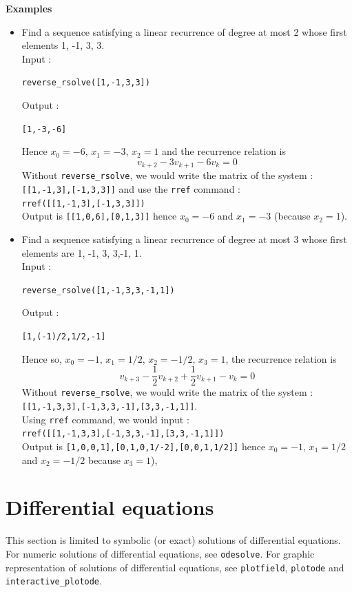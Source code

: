 \documentclass[a4paper,11pt]{book}
\begin{document}
{\bf Examples}
\begin{itemize}
\item Find a sequence satisfying a linear recurrence of degree at 
most 2 whose first elements 1, -1, 3, 3.\\
Input :
\begin{center}{\tt reverse\_rsolve([1,-1,3,3])}\end{center}
Output  :
\begin{center}{\tt  [1,-3,-6]}\end{center} 
Hence $x_0=-6$, $x_1=-3$, $x_2=1$ and the recurrence relation is
 \[ v_{k+2} -3v_{k+1} -6 v_k =0\]
Without {\tt reverse\_rsolve}, we would write the matrix of the system :\\
{\tt [[1,-1,3],[-1,3,3]]} and use the {\tt rref} command :\\
{\tt rref([[1,-1,3],[-1,3,3]])}\\
Output is {\tt [[1,0,6],[0,1,3]]} hence $x_0=-6$ and $x_1=-3$ 
(because $x_2=1$).

\item Find a sequence satisfying a linear recurrence of degree at 
most 3 whose first elements are 1, -1, 3, 3,-1, 1.\\
Input :
\begin{center}{\tt reverse\_rsolve([1,-1,3,3,-1,1])}\end{center}
Output  :
\begin{center}{\tt [1,(-1)/2,1/2,-1]}\end{center} 
Hence so, $x_0=-1$, $x_1=1/2$, $x_2=-1/2$, $x_3=1$, the recurrence
relation is
\[ v_{k+3} -\frac{1}{2} v_{k+2} +\frac{1}{2} v_{k+1} -v_k =0 \]
Without {\tt reverse\_rsolve}, we would write the matrix of the system :\\
{\tt [[1,-1,3,3],[-1,3,3,-1],[3,3,-1,1]]}.\\
Using {\tt rref} command, we would input :\\
{\tt rref([[1,-1,3,3],[-1,3,3,-1],[3,3,-1,1]])}\\
Output is {\tt [1,0,0,1],[0,1,0,1/-2],[0,0,1,1/2]]}
hence $x_0=-1$, $x_1=1/2$ and $x_2=-1/2$ because $x_3=1$),
\end{itemize}

\section{Differential equations}
This section is limited to symbolic (or exact) solutions of
differential equations.
For numeric solutions of differential equations, see {\tt odesolve}.
For graphic representation of solutions of differential equations, 
see  {\tt plotfield}, {\tt plotode} and {\tt interactive\_plotode}. 
\end{document}
